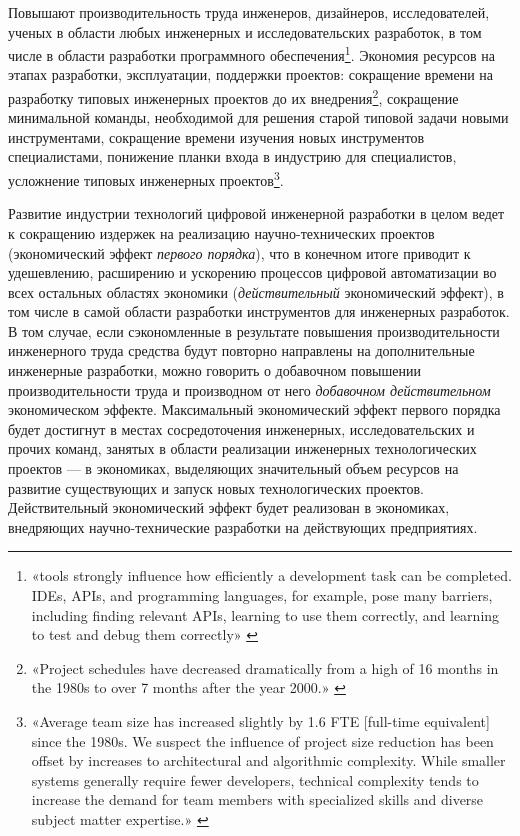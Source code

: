 \documentclass{article}
\begin{document}
Повышают производительность труда инженеров, дизайнеров, исследователей, ученых в области любых инженерных и исследовательских разработок, в том числе в области разработки программного обеспечения\footnote{«tools strongly influence how efficiently a development task can be completed. IDEs, APIs, and programming languages, for example, pose many barriers, including finding relevant APIs, learning to use them correctly, and learning to test and debug them correctly» \cite{softwareProductivity2019}}. Экономия ресурсов на этапах разработки, эксплуатации, поддержки проектов: сокращение времени на разработку типовых инженерных проектов до их внедрения\footnote{«Project schedules have decreased dramatically from a high of 16 months in the 1980s to over 7 months after the year 2000.» \cite{typicalSoftProject2019}}, сокращение минимальной команды, необходимой для решения старой типовой задачи новыми инструментами, сокращение времени изучения новых инструментов специалистами, понижение планки входа в индустрию для специалистов, усложнение типовых инженерных проектов\footnote{«Average team size has increased slightly by 1.6 FTE [full-time equivalent] since the 1980s. We suspect the influence of project size reduction has been offset by increases to architectural and algorithmic complexity. While smaller systems generally require fewer developers, technical complexity tends to increase the demand for team members with specialized skills and diverse subject matter expertise.» \cite{typicalSoftProject2019}}.

Развитие индустрии технологий цифровой инженерной разработки в целом ведет к сокращению издержек на реализацию научно-технических проектов (экономический эффект \textit{первого порядка}), что в конечном итоге приводит к удешевлению, расширению и ускорению процессов цифровой автоматизации во всех остальных областях экономики (\textit{действительный} экономический эффект), в том числе в самой области разработки инструментов для инженерных разработок. В том случае, если сэкономленные в результате повышения производительности инженерного труда средства будут повторно направлены на дополнительные инженерные разработки, можно говорить о добавочном повышении производительности труда и производном от него \textit{добавочном действительном} экономическом эффекте. Максимальный экономический эффект первого порядка будет достигнут в местах сосредоточения инженерных, исследовательских и прочих команд, занятых в области реализации инженерных технологических проектов — в экономиках, выделяющих значительный объем ресурсов на развитие существующих и запуск новых технологических проектов. Действительный экономический эффект будет реализован в экономиках, внедряющих научно-технические разработки на действующих предприятиях.
\end{document}
